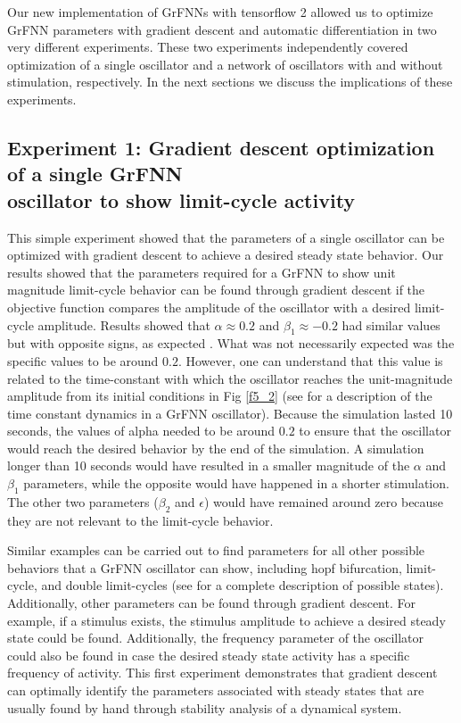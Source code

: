 \documentclass{report}
\begin{document}
Our new implementation of GrFNNs with tensorflow 2 allowed us to optimize GrFNN parameters with gradient descent and automatic differentiation in two very different experiments. These two experiments independently covered optimization of a single oscillator and a network of oscillators with and without stimulation, respectively. In the next sections we discuss the implications of these experiments.

\subsection{Experiment 1: Gradient descent optimization of a single GrFNN \\ oscillator to show limit-cycle activity} 


This simple experiment showed that the parameters of a single oscillator can be optimized with gradient descent to achieve a desired steady state behavior. Our results showed that the parameters required for a GrFNN to show unit magnitude limit-cycle behavior can be found through gradient descent if the objective function compares the amplitude of the oscillator with a desired limit-cycle amplitude. Results showed that $\alpha \approx 0.2$ and $\beta_1 \approx -0.2$ had similar values but with opposite signs, as expected \cite{kim2015signal}. What was not necessarily expected was the specific values to be around $0.2$. However, one can understand that this value is related to the time-constant with which the oscillator reaches the unit-magnitude amplitude from its initial conditions in Fig \ref{f5_2} (see \cite{kim2015signal} for a description of the time constant dynamics in a GrFNN oscillator). Because the simulation lasted 10 seconds, the values of alpha needed to be around $0.2$ to ensure that the oscillator would reach the desired behavior by the end of the simulation. A simulation longer than 10 seconds would have resulted in a smaller magnitude of the $\alpha$ and $\beta_1$ parameters, while the opposite would have happened in a shorter stimulation. The other two parameters ($\beta_2$ and $\epsilon$) would have remained around zero because they are not relevant to the limit-cycle behavior.

Similar examples can be carried out to find parameters for all other possible behaviors that a GrFNN oscillator can show, including hopf bifurcation, limit-cycle, and double limit-cycles (see \cite{kim2015signal} for a complete description of possible states). Additionally, other parameters can be found through gradient descent. For example, if a stimulus exists, the stimulus amplitude to achieve a desired steady state could be found. Additionally, the frequency parameter of the oscillator could also be found in case the desired steady state activity has a specific frequency of activity. This first experiment demonstrates that gradient descent can optimally identify the parameters associated with steady states that are usually found by hand through stability analysis of a dynamical system. 
\end{document}
